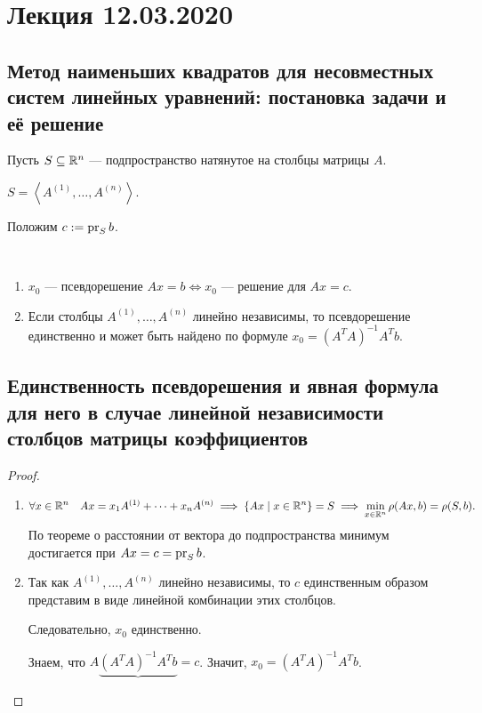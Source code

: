 \section{Лекция 12.03.2020} 

\subsection{Метод наименьших квадратов для несовместных систем линейных уравнений: постановка задачи и её решение}

Пусть $S \subseteq \mathbb{R}^n$ --- подпространство натянутое на столбцы матрицы $A$.

$S = \left< A^{(1)}, \dots, A^{(n)} \right>$.

Положим $c := \operatorname{\mathop{\mathrm{pr}}}_S b$.

\begin{proposal}~
    \begin{enumerate}
    \item $x_0$ --- псевдорешение $Ax = b \iff x_0$ --- решение для $Ax = c$.  
    \item Если столбцы $A^{(1)}, \dots, A^{(n)}$ линейно независимы, то псевдорешение единственно и может быть найдено по формуле $x_0 = (A^{T} A)^{-1} A^{T} b$.
    \end{enumerate}
\end{proposal}


\subsection{Единственность псевдорешения и явная формула для него в случае линейной независимости столбцов матрицы коэффициентов}

\begin{proof}~
    \begin{enumerate}
        \item
            \begin{equation*}
                \forall x \in \mathbb{R}^n \quad Ax = x_1 A^{(1)} + \dots + x_n A^{(n)} \implies \{Ax \mid x \in \mathbb{R}^n\} = S \implies \min_{x \in \mathbb{R}^n} \rho(Ax, b) = \rho(S, b)
            .\end{equation*}
            По теореме о расстоянии от вектора до подпространства минимум достигается при $Ax = c = \operatorname{\mathop{\mathrm{pr}}}_S b$.

        \item
            Так как $A^{(1)}, \dots, A^{(n)}$ линейно независимы, то $c$ единственным образом представим в виде линейной комбинации этих столбцов.

            Следовательно, $x_0$ единственно.

            Знаем, что $A \underbrace{(A^{T} A)^{-1} A^{T} b} = c$. Значит, $x_0 = (A^{T} A)^{-1} A^{T} b$.
            \qedhere
    \end{enumerate}
\end{proof}

